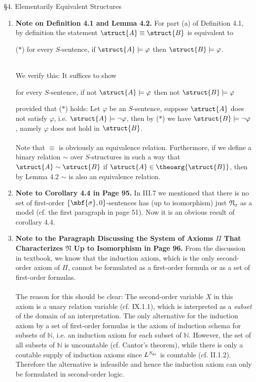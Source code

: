\ 
\\
\\
{\large \S4. Elementarily Equivalent Structures}
\begin{enumerate}[1.]
\item \textbf{Note on Definition 4.1 and Lemma 4.2.} For part (a) of Definition 4.1, by definition the statement $\struct{A} \equiv \struct{B}$ is equivalent to\smallskip\\
\begin{quoteno}{($\ast$)}
for every $S$-sentence, if $\struct{A} \models \varphi$ then $\struct{B} \models \varphi$.
\end{quoteno}\smallskip\\
We verify this: It suffices to show\\
\centerline{for every $S$-sentence, if not $\struct{A} \models \varphi$ then not $\struct{B} \models \varphi$}
provided that ($\ast$) holds: Let $\varphi$ be an $S$-sentence, suppose $\struct{A}$ does not satisfy $\varphi$, i.e. $\struct{A} \models \neg\varphi$, then by ($\ast$) we have $\struct{B} \models \neg\varphi$, namely $\varphi$ does not hold in $\struct{B}$.\\
\ \\
Note that $\equiv$ is obviously an equivalence relation. Furthermore, if we define a binary relation $\sim$ over $S$-structures in such a way that $\struct{A} \sim \struct{B}$ if $\struct{A} \in \theoarg{\struct{B}}$, then by Lemma 4.2 $\sim$ is also an equivalence relation.
%
\item \textbf{Note to Corollary 4.4 in Page 95.} In III.7 we mentioned that there is no set of first-order $\{ \mbf{\sigma}, 0 \}$-sentences has (up to isomorphism) just $\mathfrak{N}_\sigma$ as a model (cf. the first paragraph in page 51). Now it is an obvious result of corollary 4.4.
%
\item \textbf{Note to the Paragraph Discussing the System of Axioms $\Pi$ That Characterizes $\mathfrak{N}$ Up to Isomorphism in Page 96.} From the discussion in textbook, we know that the induction axiom, which is the only second-order axiom of $\Pi$, cannot be formulated as a first-order formula or as a set of first-order formulas.\\
\\
The reason for this should be clear: The second-order variable $X$ in this axiom is a unary relation variable (cf. IX.1.1), which is interpreted as a \textit{subset} of the domain of an interpretation. The only alternative for the induction axiom by a set of first-order formulas is the axiom of induction schema for subsets of $\mathbb{N}$, i.e. an induction axiom for each subset of $\mathbb{N}$. However, the set of all subsets of $\mathbb{N}$ is uncountable (cf. Cantor's theorem), while there is only a coutable supply of induction axioms since $L^{S_{\mbox{\tiny ar}}}$ is countable (cf. II.1.2). Therefore the alternative is infeasible and hence the induction axiom can only be formulated in second-order logic.

\end{enumerate}
